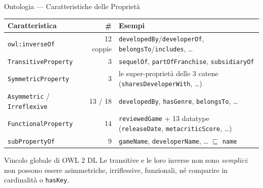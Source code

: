\documentclass[aspectratio=169,11pt]{beamer}
\begin{document}
\begin{frame}{Ontologia --- Caratteristiche delle Propriet\`a}
  \footnotesize
  \begin{tabularx}{\textwidth}{@{}l r >{\raggedright\arraybackslash}X@{}}
    \toprule
    \textbf{Caratteristica} & \textbf{\#} & \textbf{Esempi} \\
    \midrule
    \texttt{owl:inverseOf}          & 12 coppie & \texttt{developedBy}/\texttt{developerOf}, \texttt{belongsTo}/\texttt{includes}, \dots \\
    \texttt{TransitiveProperty}     & 3  & \texttt{sequelOf}, \texttt{partOfFranchise}, \texttt{subsidiaryOf} \\
    \texttt{SymmetricProperty}      & 3  & le super-propriet\`a delle 3 catene (\texttt{sharesDeveloperWith}, \dots) \\
    \texttt{Asymmetric} / \texttt{Irreflexive} & 13 / 18 & \texttt{developedBy}, \texttt{hasGenre}, \texttt{belongsTo}, \dots \\
    \texttt{FunctionalProperty}     & 14 & \texttt{reviewedGame} + 13 datatype (\texttt{releaseDate}, \texttt{metacriticScore}, \dots) \\
    \texttt{subPropertyOf}          & 9  & \texttt{gameName}, \texttt{developerName}, \dots{} $\sqsubseteq$ \texttt{name} \\
    \bottomrule
  \end{tabularx}

  \vspace{4pt}

  \begin{alertblock}{Vincolo globale di OWL 2 DL}
    \small
    Le transitive e le loro inverse non sono \emph{semplici}: non possono essere asimmetriche,
    irriflessive, funzionali, n\'e comparire in cardinalit\`a o \texttt{hasKey}.
  \end{alertblock}
\end{frame}
\end{document}
